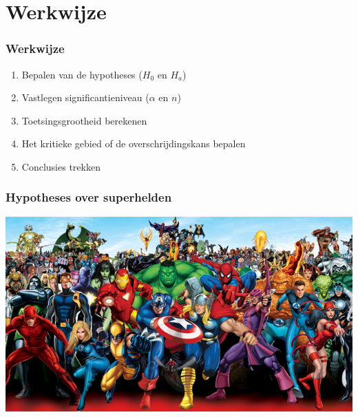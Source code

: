 \documentclass{beamer}
\begin{document}
\section{Werkwijze}
\sectionframelogo{}

\begin{frame}
  \frametitle{Werkwijze}

  \begin{enumerate}
    \item Bepalen van de hypotheses ($H_0$ en $H_a$)
    \item Vastlegen significantieniveau ($\alpha$ en $n$)
    \item Toetsingsgrootheid berekenen
    \item Het kritieke gebied of de overschrijdingskans bepalen
    \item Conclusies trekken
  \end{enumerate}
\end{frame}

\begin{frame}
  \frametitle{Hypotheses over superhelden}

  \includegraphics[width=\textwidth]{img/les5-heroes}
\end{frame}
\end{document}
